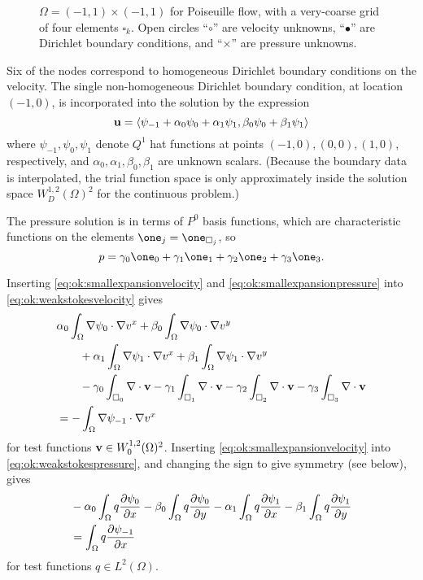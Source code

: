 \begin{figure}

\caption{$\Omega=(-1,1)\times(-1,1)$ for Poiseuille flow, with a very-coarse grid of four elements $\square_k$.  Open circles ``{\large $\circ$}'' are velocity unknowns, ``$\bullet$'' are Dirichlet boundary conditions, and ``$\times$'' are pressure unknowns.}
\label{fig:ok:poiseuille}
\end{figure}

Six of the nodes correspond to homogeneous Dirichlet boundary conditions on the velocity.  The single non-homogeneous Dirichlet boundary condition, at location $(-1,0)$, is incorporated into the solution by the expression
\begin{equation} 
\mathbf{u} = \left<\psi_{-1}+\alpha_0\psi_0+\alpha_1\psi_1,\beta_0\psi_0+\beta_1\psi_1\right>  \label{eq:ok:smallexpansionvelocity}
\end{equation}
where $\psi_{-1},\psi_0,\psi_1$ denote $Q^1$ hat functions at points $(-1,0),(0,0),(1,0)$, respectively, and $\alpha_0,\alpha_1,\beta_0,\beta_1$ are unknown scalars.  (Because the boundary data is interpolated, the trial function space is only approximately inside the solution space $W_D^{1,2}(\Omega)^2$ for the continuous problem.)

The pressure solution is in terms of $P^0$ basis functions, which are characteristic functions on the elements $\one_j = \one_{\square_j}$, so
\begin{equation}
p = \gamma_0 \one_0 + \gamma_1 \one_1 + \gamma_2 \one_2 + \gamma_3 \one_3.  \label{eq:ok:smallexpansionpressure}
\end{equation}

Inserting \eqref{eq:ok:smallexpansionvelocity} and \eqref{eq:ok:smallexpansionpressure} into \eqref{eq:ok:weakstokesvelocity} gives
\begin{align}
&\alpha_0 \int_\Omega \nabla \psi_0 \cdot \nabla v^x + \beta_0 \int_\Omega \nabla \psi_0 \cdot \nabla v^y \label{eq:ok:smallconcretevelocity} \\
&\qquad + \alpha_1 \int_\Omega \nabla \psi_1 \cdot \nabla v^x + \beta_1 \int_\Omega \nabla \psi_1 \cdot \nabla v^y \notag \\
&\qquad - \gamma_0 \int_{\square_0} \nabla\cdot \mathbf{v} - \gamma_1 \int_{\square_1} \nabla\cdot \mathbf{v} - \gamma_2 \int_{\square_2} \nabla\cdot \mathbf{v} - \gamma_3 \int_{\square_3} \nabla\cdot \mathbf{v} \notag \\
&= - \int_\Omega \nabla \psi_{-1} \cdot \nabla v^x \notag
\end{align}
for test functions $\mathbf{v} \in W_0^{1,2}(\Omega)^2$.  Inserting \eqref{eq:ok:smallexpansionvelocity} into \eqref{eq:ok:weakstokespressure}, and changing the sign to give symmetry (see below), gives
\begin{align}
&- \alpha_0 \int_\Omega q \frac{\partial \psi_0}{\partial x} - \beta_0 \int_\Omega q \frac{\partial \psi_0}{\partial y} - \alpha_1 \int_\Omega q \frac{\partial \psi_1}{\partial x} - \beta_1 \int_\Omega q \frac{\partial \psi_1}{\partial y}  \label{eq:ok:smallconcretepressure} \\
&= \int_\Omega q \frac{\partial \psi_{-1}}{\partial x} \notag
\end{align}
for test functions $q \in L^2(\Omega)$.

